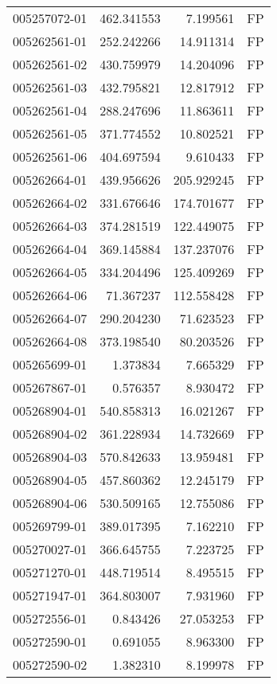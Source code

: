 \begin{tabular}{lrrl}
005257072-01 &  462.341553 &     7.199561 &   FP \\
005262561-01 &  252.242266 &    14.911314 &   FP \\
005262561-02 &  430.759979 &    14.204096 &   FP \\
005262561-03 &  432.795821 &    12.817912 &   FP \\
005262561-04 &  288.247696 &    11.863611 &   FP \\
005262561-05 &  371.774552 &    10.802521 &   FP \\
005262561-06 &  404.697594 &     9.610433 &   FP \\
005262664-01 &  439.956626 &   205.929245 &   FP \\
005262664-02 &  331.676646 &   174.701677 &   FP \\
005262664-03 &  374.281519 &   122.449075 &   FP \\
005262664-04 &  369.145884 &   137.237076 &   FP \\
005262664-05 &  334.204496 &   125.409269 &   FP \\
005262664-06 &   71.367237 &   112.558428 &   FP \\
005262664-07 &  290.204230 &    71.623523 &   FP \\
005262664-08 &  373.198540 &    80.203526 &   FP \\
005265699-01 &    1.373834 &     7.665329 &   FP \\
005267867-01 &    0.576357 &     8.930472 &   FP \\
005268904-01 &  540.858313 &    16.021267 &   FP \\
005268904-02 &  361.228934 &    14.732669 &   FP \\
005268904-03 &  570.842633 &    13.959481 &   FP \\
005268904-05 &  457.860362 &    12.245179 &   FP \\
005268904-06 &  530.509165 &    12.755086 &   FP \\
005269799-01 &  389.017395 &     7.162210 &   FP \\
005270027-01 &  366.645755 &     7.223725 &   FP \\
005271270-01 &  448.719514 &     8.495515 &   FP \\
005271947-01 &  364.803007 &     7.931960 &   FP \\
005272556-01 &    0.843426 &    27.053253 &   FP \\
005272590-01 &    0.691055 &     8.963300 &   FP \\
005272590-02 &    1.382310 &     8.199978 &   FP \\

\end{tabular}

